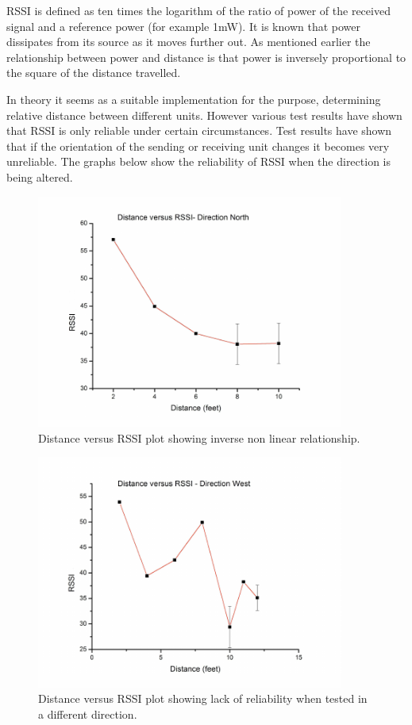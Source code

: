 \documentclass[10pt,a4paper]{article}
\begin{document}
RSSI is defined as ten times the logarithm of the ratio of power of the received signal
and a reference power (for example 1mW). It is known that power dissipates from its source
as it moves further out. As mentioned earlier the relationship between power and distance is that power is inversely
proportional to the square of the distance travelled. \cite{RSSI}

In theory it seems as a suitable implementation for the purpose, determining relative distance between
different units. However various test results have shown that RSSI is only reliable under certain circumstances.
Test results have shown that if the orientation of the sending or receiving unit changes it becomes very unreliable.
The graphs below show the reliability of RSSI when the direction is being altered.\cite{RSSI}

\begin{figure}[H]
\centering
\includegraphics[width=0.9\textwidth]{North.pdf}
\caption{Distance versus RSSI plot showing inverse non linear
relationship.\cite{RSSI}}
\label{North}
\end{figure}

\begin{figure}[H]
\centering
\includegraphics[width=0.9\textwidth]{West.pdf}
\caption{Distance versus RSSI plot showing lack of
reliability when tested in a different direction.\cite{RSSI}} 
\label{West}
\end{figure}
\end{document}
